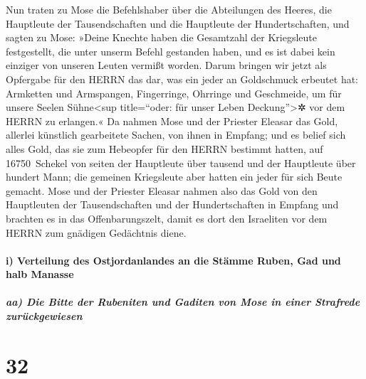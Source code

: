 Nun traten zu Mose die Befehlshaber über die Abteilungen
des Heeres, die Hauptleute der Tausendschaften und die Hauptleute der
Hundertschaften, und sagten zu Mose: »Deine Knechte haben
die Gesamtzahl der Kriegsleute festgestellt, die unter unserm Befehl
gestanden haben, und es ist dabei kein einziger von unseren Leuten
vermißt worden. Darum bringen wir jetzt als Opfergabe für
den HERRN das dar, was ein jeder an Goldschmuck erbeutet hat: Armketten
und Armspangen, Fingerringe, Ohrringe und Geschmeide, um für unsere
Seelen Sühne\textless sup title=``oder: für unser Leben
Deckung''\textgreater✲ vor dem HERRN zu erlangen.« Da
nahmen Mose und der Priester Eleasar das Gold, allerlei künstlich
gearbeitete Sachen, von ihnen in Empfang; und es belief
sich alles Gold, das sie zum Hebeopfer für den HERRN bestimmt hatten,
auf 16750~Schekel von seiten der Hauptleute über tausend und der
Hauptleute über hundert Mann; die gemeinen Kriegsleute
aber hatten ein jeder für sich Beute gemacht. Mose und
der Priester Eleasar nahmen also das Gold von den Hauptleuten der
Tausendschaften und der Hundertschaften in Empfang und brachten es in
das Offenbarungszelt, damit es dort den Israeliten vor dem HERRN zum
gnädigen Gedächtnis diene.

\hypertarget{i-verteilung-des-ostjordanlandes-an-die-stuxe4mme-ruben-gad-und-halb-manasse}{%
\paragraph{i) Verteilung des Ostjordanlandes an die Stämme Ruben, Gad
und halb
Manasse}\label{i-verteilung-des-ostjordanlandes-an-die-stuxe4mme-ruben-gad-und-halb-manasse}}

\hypertarget{aa-die-bitte-der-rubeniten-und-gaditen-von-mose-in-einer-strafrede-zuruxfcckgewiesen}{%
\subparagraph{aa) Die Bitte der Rubeniten und Gaditen von Mose in einer
Strafrede
zurückgewiesen}\label{aa-die-bitte-der-rubeniten-und-gaditen-von-mose-in-einer-strafrede-zuruxfcckgewiesen}}

\hypertarget{section-31}{%
\section{32}\label{section-31}}

